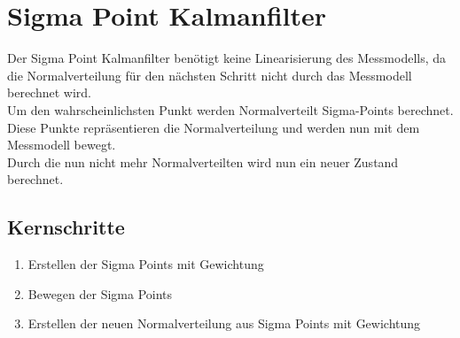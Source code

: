 \chapter{Sigma Point Kalmanfilter}
\label{chp:sigmaPointKalmanfilter}

Der Sigma Point Kalmanfilter benötigt keine Linearisierung des Messmodells, da die Normalverteilung für den nächsten Schritt nicht durch das Messmodell berechnet wird.\\
Um den wahrscheinlichsten Punkt werden Normalverteilt Sigma-Points berechnet. Diese Punkte repräsentieren die Normalverteilung und werden nun mit dem Messmodell bewegt. \\
Durch die nun nicht mehr Normalverteilten wird nun ein neuer Zustand berechnet.

\section{Kernschritte}
\begin{enumerate}
	\item Erstellen der Sigma Points mit Gewichtung
	\item Bewegen der Sigma Points 
	\item Erstellen der neuen Normalverteilung aus Sigma Points mit Gewichtung
\end{enumerate}